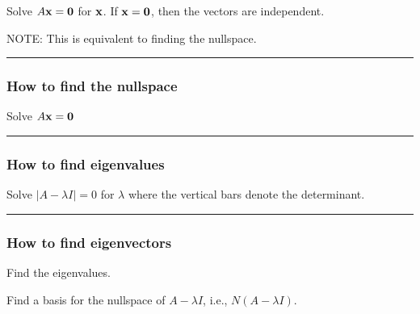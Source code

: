  \begin{questions}
\question Solve $A{\bf x} = {\bf 0}$ for ${\bf x}$.  
\question If  $ {\bf x} = {\bf 0}$, then the vectors are independent.  

NOTE: This is equivalent to finding the nullspace.
\end{questions}
 
 
\rule[0.001in]{\textwidth}{0.00025in}




 
 
 \subsubsection*{How to find the nullspace}
 

 \begin{questions}
\question Solve $A{\bf x} = {\bf 0}$ 
\end{questions}
 
 
\rule[0.001in]{\textwidth}{0.00025in}





 
 \subsubsection*{How to find eigenvalues}
 

 \begin{questions}
\question Solve $|A-\lambda I |= 0$ for $\lambda$  where the vertical bars denote the determinant. 
\end{questions}
 
 
\rule[0.001in]{\textwidth}{0.00025in}







 
 \subsubsection*{How to find eigenvectors}
 

 \begin{questions}
\question Find the eigenvalues.  

\question Find a basis for the nullspace of $A-\lambda I$, i.e., $N(A-\lambda I)$.  


\end{questions}
 
